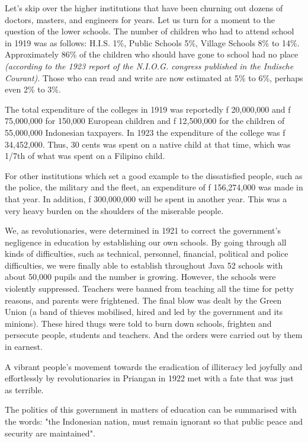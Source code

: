 Let's skip over the higher institutions that have been churning out dozens of doctors, masters, 
and engineers for years. Let us turn for a moment to the question of the lower schools. 
The number of children who had to attend school in 1919 was as follows: H.I.S. 1\%, 
Public Schools 5\%, Village Schools 8\% to 14\%. Approximately 86\% of the children 
who should have gone to school had no place \emph{(according to the 1923 report of the 
N.I.O.G. congress published in the Indische Courant)}. Those who can read and write 
are now estimated at 5\% to 6\%, perhaps even 2\% to 3\%.\nline

The total expenditure of the colleges in 1919 was reportedly f 20,000,000 and f 75,000,000 
for 150,000 European children and f 12,500,000 for the children of 55,000,000 Indonesian 
taxpayers. In 1923 the expenditure of the college was f 34,452,000. Thus, 30 cents was 
spent on a native child at that time, which was 1/7th of what was spent on a Filipino child.\nline

For other institutions which set a good example to the dissatisfied people, such as the police, 
the military and the fleet, an expenditure of f 156,274,000 was made in that year. In addition, 
f 300,000,000 will be spent in another year. This was a very heavy burden on the shoulders of the miserable people.\nline

We, as revolutionaries, were determined in 1921 to correct the government's negligence 
in education by establishing our own schools. By going through all kinds of difficulties, 
such as technical, personnel, financial, political and police difficulties, we were finally 
able to establish throughout Java 52 schools with about 50,000 pupils and the number is growing. 
However, the schools were violently suppressed. Teachers were banned from teaching all the 
time for petty reasons, and parents were frightened. The final blow was dealt by the Green 
Union (a band of thieves mobilised, hired and led by the government and its minions). 
These hired thugs were told to burn down schools, frighten and persecute people, students 
and teachers. And the orders were carried out by them in earnest.\nline

A vibrant people's movement towards the eradication of illiteracy led joyfully and effortlessly 
by revolutionaries in Priangan in 1922 met with a fate that was just as terrible.\nline

The politics of this government in matters of education can be summarised with the words: 
"the Indonesian nation, must remain ignorant so that public peace and security are maintained".\nline

